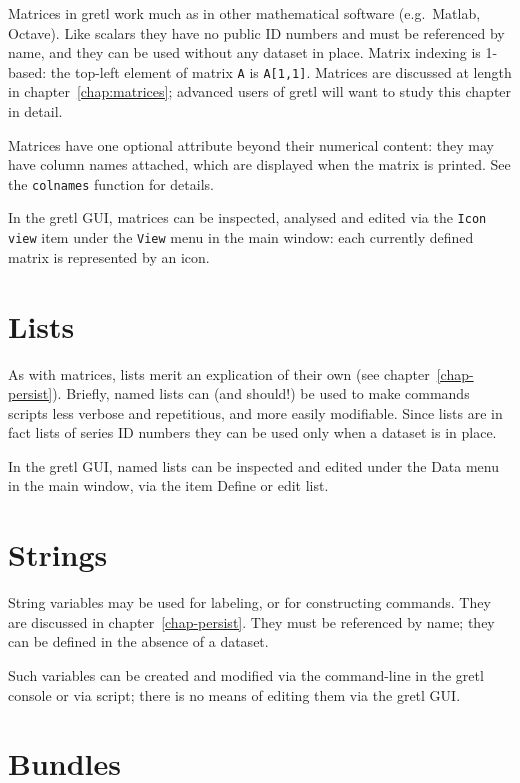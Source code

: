 Matrices in gretl work much as in other mathematical software (e.g.\
\textsf{Matlab}, \textsf{Octave}). Like scalars they have no public ID
numbers and must be referenced by name, and they can be used without
any dataset in place. Matrix indexing is 1-based: the top-left element
of matrix \texttt{A} is \texttt{A[1,1]}.  Matrices are discussed at
length in chapter~\ref{chap:matrices}; advanced users of gretl will
want to study this chapter in detail.

Matrices have one optional attribute beyond their numerical content:
they may have column names attached, which are displayed when the
matrix is printed. See the \texttt{colnames} function for details.

In the gretl GUI, matrices can be inspected, analysed and edited via
the \texttt{Icon view} item under the \texttt{View} menu in the main
window: each currently defined matrix is represented by an icon.

\section{Lists}
\label{sec:Lists}

As with matrices, lists merit an explication of their own (see
chapter~\ref{chap-persist}).  Briefly, named lists can (and should!)
be used to make commands scripts less verbose and repetitious, and
more easily modifiable. Since lists are in fact lists of series ID
numbers they can be used only when a dataset is in place.

In the gretl GUI, named lists can be inspected and edited under the
\textsf{Data} menu in the main window, via the item \textsf{Define or
  edit list}.

\section{Strings}
\label{sec:Strings}

String variables may be used for labeling, or for constructing
commands. They are discussed in chapter~\ref{chap-persist}. They must
be referenced by name; they can be defined in the absence of a
dataset.

Such variables can be created and modified via the command-line in
the gretl console or via script; there is no means of editing them
via the gretl GUI.


\section{Bundles}
\label{sec:Bundles}

